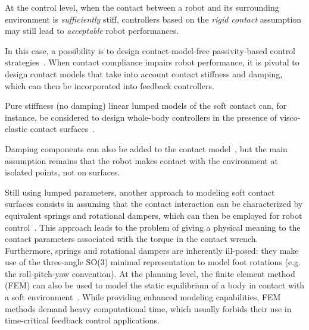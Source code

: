 At the control level, when the contact between a robot and its surrounding environment is \emph{sufficiently} stiff, controllers based on the \emph{rigid contact} assumption may still lead to \emph{acceptable} robot performances. 

In this case, a possibility is to design contact-model-free passivity-based control strategies~\citep{Henze2016,Mesesan2019}. 
When contact compliance impairs robot performance, it is pivotal to design contact models that take into account contact stiffness and damping, which can then be incorporated into feedback controllers.

Pure stiffness (no damping) linear lumped models of the soft contact can, for instance, be considered to design whole-body controllers in the presence of visco-elastic contact surfaces~\citep{Raibert1981,Flayols2020,Catalano2020}. 

Damping components can also be added to the contact model~\citep{Chiaverini1994Force/positionManipulators,Fahmi2020STANCE:Terrain,Azad2016},
but the main assumption remains that the robot makes contact with the environment at isolated points, not on surfaces. 



Still using lumped parameters, another approach to modeling soft contact surfaces consists in assuming that the contact interaction can be characterized by equivalent springs and rotational dampers, which can then be employed for robot control~\citep{Li2019,Sygulla2020AFootholds:}. This approach leads to the problem of giving a physical meaning to the contact parameters associated with the torque in the contact wrench. Furthermore, springs and rotational dampers are inherently ill-posed: they make use of the three-angle SO(3) minimal representation to model foot rotations (e.g. the roll-pitch-yaw convention).
At the planning level, the finite element method (FEM) can also be used to model the static equilibrium of a body in contact with a soft environment~\citep{Bouyarmane2011FEM-basedSupport}. While providing enhanced modeling capabilities, FEM methods demand heavy computational time, which usually forbids their use in time-critical feedback control applications.
